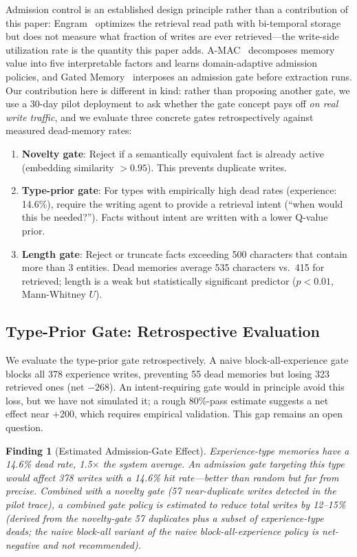 \documentclass{llncs}
\newtheorem{finding}{Finding}
\begin{document}
Admission control is an established design principle rather than a contribution of this
paper: Engram~\cite{engram} optimizes the retrieval read path with bi-temporal storage but does not
measure what fraction of writes are ever retrieved---the write-side utilization rate is the
quantity this paper adds. A-MAC~\cite{amac} decomposes memory value into five interpretable factors and learns
domain-adaptive admission policies, and Gated Memory~\cite{gatedmem} interposes an admission
gate before extraction runs. Our contribution here is different in kind: rather than proposing
another gate, we use a 30-day pilot deployment to ask whether the gate concept pays off
\emph{on real write traffic}, and we evaluate three concrete gates retrospectively against
measured dead-memory rates:

\begin{enumerate}
\item \textbf{Novelty gate}: Reject if a semantically equivalent fact is already active (embedding similarity $> 0.95$). This prevents duplicate writes.
\item \textbf{Type-prior gate}: For types with empirically high dead rates (experience: 14.6\%), require the writing agent to provide a retrieval intent (``when would this be needed?''). Facts without intent are written with a lower Q-value prior.
\item \textbf{Length gate}: Reject or truncate facts exceeding 500 characters that contain more than 3 entities. Dead memories average 535 characters vs.\ 415 for retrieved; length is a weak but statistically significant predictor ($p < 0.01$, Mann-Whitney $U$).
\end{enumerate}

\subsection{Type-Prior Gate: Retrospective Evaluation}

We evaluate the type-prior gate retrospectively. A naive block-all-experience gate blocks all 378 experience writes, preventing 55 dead memories but losing 323 retrieved ones (net $-268$). An intent-requiring gate would in principle avoid this loss, but we have not simulated it; a rough 80\%-pass estimate suggests a net effect near +200, which requires empirical validation. This gap remains an open question.



\begin{finding}[Estimated Admission-Gate Effect]
Experience-type memories have a 14.6\% dead rate, 1.5$\times$ the system average. An admission gate targeting this type would affect 378 writes with a 14.6\% hit rate---better than random but far from precise. Combined with a novelty gate (57 near-duplicate writes detected in the pilot trace), a combined gate policy is \emph{estimated} to reduce total writes by 12--15\% (derived from the novelty-gate 57 duplicates plus a subset of experience-type deads; the naive block-all variant of the naive block-all-experience policy is net-negative and not recommended).
\end{finding}
\end{document}
